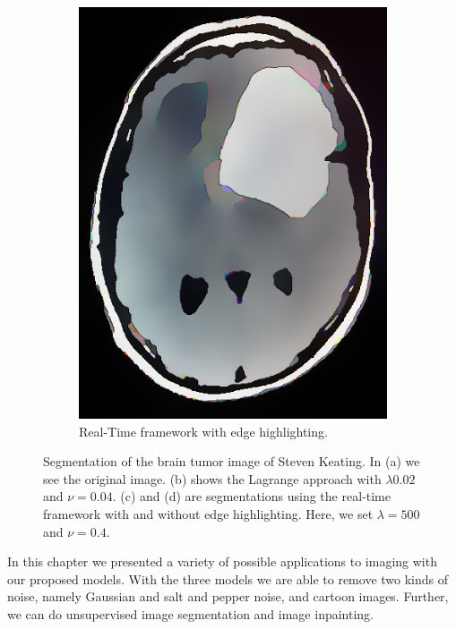 \documentclass[abstracton]{scrreprt}
\begin{document}
\begin{figure}[!ht]
\begin{subfigure}[b]{0.37\textwidth}
                    \includegraphics[width=\textwidth]{img/segmentation/rt/keating_eh.png}
                    \caption{Real-Time framework with edge highlighting.}
                \end{subfigure}
                \caption[Image segmentation for a brain tumor image.]{Segmentation of the brain tumor image of Steven Keating. In (a) we see the original image. (b) shows the Lagrange approach with $\lambda 0.02$ and $\nu = 0.04$. (c) and (d) are segmentations using the real-time framework with and without edge highlighting. Here, we set $\lambda = 500$ and $\nu = 0.4$.}
            \label{fig:segmentation_evolution_keating}
            \end{figure}

    In this chapter we presented a variety of possible applications to imaging with our proposed models. With the three models we are able to remove two kinds of noise, namely Gaussian and salt and pepper noise, and cartoon images. Further, we can do unsupervised image segmentation and image inpainting.
\end{document}
